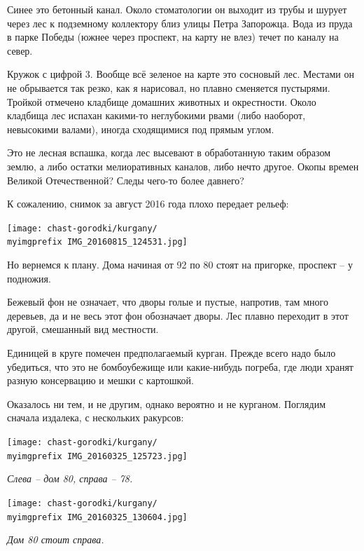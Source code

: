 Синее это бетонный канал. Около стоматологии он выходит из трубы и шурует через лес к подземному коллектору близ улицы Петра Запорожца. Вода из пруда в парке Победы (южнее через проспект, на карту не влез) течет по каналу на север.

Кружок с цифрой 3. Вообще всё зеленое на карте это сосновый лес. Местами он не обрывается так резко, как я нарисовал, но плавно сменяется пустырями. Тройкой отмечено кладбище домашних животных и окрестности. Около кладбища лес испахан какими-то неглубокими рвами (либо наоборот, невысокими валами), иногда сходящимися под прямым углом.

Это не лесная вспашка, когда лес высевают в обработанную таким образом землю, а либо остатки мелиоративных каналов, либо нечто другое. Окопы времен Великой Отечественной? Следы чего-то более давнего?

К сожалению, снимок за август 2016 года плохо передает рельеф:

\begin{center}
\texttt{[image: chast-gorodki/kurgany/\\myimgprefix IMG\_20160815\_124531.jpg]}
\end{center}

Но вернемся к плану. Дома начиная от 92 по 80 стоят на пригорке, проспект – у подножия.

Бежевый фон не означает, что дворы голые и пустые, напротив, там много деревьев, да и не весь этот фон обозначает дворы. Лес плавно переходит в этот другой, смешанный вид местности.

Единицей в круге помечен предполагаемый курган. Прежде всего надо было убедиться, что это не бомбоубежище или какие-нибудь погреба, где люди хранят разную консервацию и мешки с картошкой.

Оказалось ни тем, и не другим, однако вероятно и не курганом. Поглядим сначала издалека, с нескольких ракурсов:

\begin{center}
\texttt{[image: chast-gorodki/kurgany/\\myimgprefix IMG\_20160325\_125723.jpg]}

\textit{Слева – дом 80, справа – 78.}
\end{center}

\begin{center}
\texttt{[image: chast-gorodki/kurgany/\\myimgprefix IMG\_20160325\_130604.jpg]}

\textit{Дом 80 стоит справа.}
\end{center}

